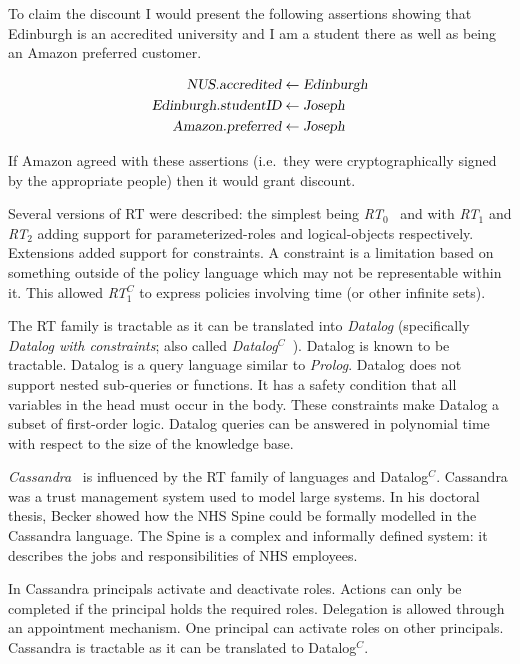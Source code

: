 \documentclass[a4paper,sfsidenotes]{%
  article%
}
\begin{document}
To claim the discount I would present the following assertions showing that
Edinburgh is an accredited university and I am a student there as well as being
an Amazon preferred customer.

\begin{align*}
  \textsl{NUS.accredited}      & \gets  \textsl{Edinburgh} \\
  \textsl{Edinburgh.studentID} & \gets  \textsl{Joseph}    \\
  \textsl{Amazon.preferred}    & \gets  \textsl{Joseph}    \\
\end{align*}

If Amazon agreed with these assertions (i.e.\ they were cryptographically signed
by the appropriate people) then it would grant discount.

Several versions of RT were described: the simplest being
\emph{RT$_0$}~\cite{Li:2003tj} and with \emph{RT$_1$} and \emph{RT$_2$} adding
support for parameterized-roles and logical-objects respectively. Extensions
added support for constraints.  A constraint is a limitation based on something
outside of the policy language which may not be representable within it.  This
allowed \emph{RT$_1^C$}\cite{Li:2003ix} to express policies involving time (or
other infinite sets).

The RT family is tractable as it can be translated into
\emph{Datalog} (specifically \emph{Datalog with constraints}; also called
\emph{Datalog$^C$~\cite{Li:2003ix}}).  Datalog is known to be tractable. Datalog is a query
language similar to \emph{Prolog}. Datalog does not support nested sub-queries
or functions. It has a safety condition that all variables in the head must
occur in the body. These constraints make Datalog a subset of first-order logic.
Datalog queries can be answered in polynomial time with respect to the size of
the knowledge base.

\emph{Cassandra}~\cite{Becker:2004fi} is influenced by the RT family of
languages and Datalog$^C$.  Cassandra was a trust management system used to
model large systems.  In his doctoral thesis, Becker showed how the NHS Spine
could be formally modelled in the Cassandra language.  The Spine is a complex
and informally defined system: it describes the jobs and responsibilities of NHS
employees.

In Cassandra principals activate and deactivate roles. Actions can only be completed if the
principal holds the required roles. Delegation is allowed through an
appointment mechanism. One principal can activate roles on other
principals. Cassandra is tractable as it can be translated
to Datalog$^C$.
\end{document}
